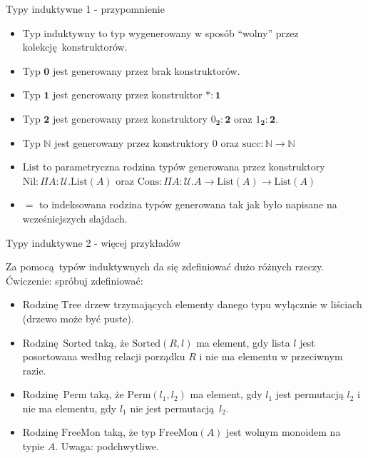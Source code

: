 \documentclass{beamer}
\newcommand{\U}{\mathcal{U}}
\begin{document}
\begin{frame}{Typy induktywne 1 - przypomnienie}
\begin{itemize}
	\item Typ induktywny to typ wygenerowany w sposób ``wolny'' przez kolekcję konstruktorów.
	\item Typ $\mathbf{0}$ jest generowany przez brak konstruktorów.
	\item Typ $\mathbf{1}$ jest generowany przez konstruktor $* : \mathbf{1}$
	\item Typ $\mathbf{2}$ jest generowany przez konstruktory $0_\mathbf{2} : \mathbf{2}$ oraz $1_\mathbf{2} : \mathbf{2}$.
	\item Typ $\mathbb{N}$ jest generowany przez konstruktory $0$ oraz $\text{succ} : \mathbb{N} \to \mathbb{N}$
	\item $\text{List}$ to parametryczna rodzina typów generowana przez konstruktory $\text{Nil} : \Pi A : \U. \text{List}(A)$ oraz $\text{Cons} : \Pi A : \U. A \to \text{List}(A) \to \text{List}(A)$
	\item $=$ to indeksowana rodzina typów generowana tak jak było napisane na wcześniejszych slajdach.
\end{itemize}
\end{frame}

\begin{frame}{Typy induktywne 2 - więcej przykładów}

Za pomocą typów induktywnych da się zdefiniować dużo różnych rzeczy. Ćwiczenie: spróbuj zdefiniować:
\begin{itemize}
	\item Rodzinę $\text{Tree}$ drzew trzymających elementy danego typu wyłącznie w liściach (drzewo może być puste).
	\item Rodzinę $\text{Sorted}$ taką, że $\text{Sorted}(R, l)$ ma element, gdy lista $l$ jest posortowana według relacji porządku $R$ i nie ma elementu w przeciwnym razie.
	\item Rodzinę $\text{Perm}$ taką, że $\text{Perm}(l_1, l_2)$ ma element, gdy $l_1$ jest permutacją $l_2$ i nie ma elementu, gdy $l_1$ nie jest permutacją $l_2$.
	\item Rodzinę $\text{FreeMon}$ taką, że typ $\text{FreeMon}(A)$ jest wolnym monoidem na typie $A$. Uwaga: podchwytliwe.
\end{itemize}
\end{frame}
\end{document}

